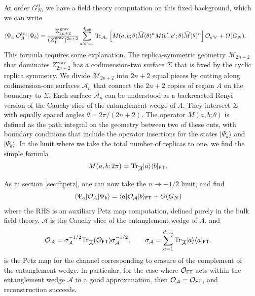 \documentclass[11pt]{article}
\newcommand{\be}{\begin{equation}}
\newcommand{\ee}{\end{equation}}
\numberwithin{equation}{section}
\def\tr{\text{Tr}}
\begin{document}
At order $G_N^0$, we have a field theory computation on this fixed background, which we can write
\begin{align}
\langle \Psi_a|\mathcal{O}_A^{(n)}|\Psi_b\rangle &=\frac{Z^{\text{grav}}_{2n+2}}{(Z^{\text{grav}}_1)^{2n+2}}\sum_{a'b'=1}^{d_{\sf code}}\tr_{\mathcal{A}_n}\left[{M}(a,b;\theta)\widehat{ M}(\theta)^n { M}(b',a';\theta)\widehat{ M}(\theta)^n\right]\mathcal{O}_{a'b'} + O(G_N).
\end{align}
This formula requires some explanation. The replica-symmetric geometry $\mathcal{M}_{2n+2}$ that dominates $Z^{\text{grav}}_{2n+2}$ has a codimension-two surface $\Sigma$ that is fixed by the cyclic replica symmetry. We divide $\mathcal{M}_{2n+2}$ into $2n+2$ equal pieces by cutting along codimension-one surfaces $\mathcal{A}_n$ that connect the $2n+2$ copies of region $A$ on the boundary to $\Sigma$. Each surface $\mathcal{A}_n$ can be understood as a backreacted Renyi version of the Cauchy slice of the entanglement wedge of $A$. They intersect $\Sigma$ with equally spaced angles $\theta = 2\pi/(2n+2)$. The operator $M(a,b;\theta)$ is defined as the path integral on the geometry between two of these cuts, with boundary conditions that include the operator insertions for the states $|\Psi_a\rangle$ and $|\Psi_b\rangle$. In the limit where we take the total number of replicas to one, we find the simple formula
\be
M(a,b;2\pi) = \tr_{\overline{\mathcal{A}}}|a\rangle\langle b|_{\sf{FT}}.
\ee

As in section \ref{sec:ftpetz}, one can now take the $n\to -1/2$ limit, and find
\be
\langle \Psi_a|\mathcal{O}_A|\Psi_b\rangle = \langle a|\mathcal{O}_{\mathcal{A}}|b\rangle_{\sf{FT}} + O(G_N)\label{RHSOF}
\ee
where the RHS is an auxiliary Petz map computation, defined purely in the bulk field theory. $\mathcal{A}$ is the Cauchy slice of the entanglement wedge of $A$, and 
\be
\mathcal{O}_{\mathcal{A}} = \sigma_{\mathcal{A}}^{-1/2} \tr_{\overline{\mathcal{A}}}(\mathcal{O}_{\sf{FT}})\sigma_{\mathcal{A}}^{-1/2}, \hspace{20pt} \sigma_{\mathcal{A}} = \sum_{a = 1}^{d_{\sf code}}\tr_{\overline{\mathcal{A}}}|a\rangle\langle a|_{\sf{FT}}.
\ee
is the Petz map for the channel corresponding to erasure of the complement of the entanglement wedge. In particular, for the case where $\mathcal{O}_{\sf FT}$ acts within the entanglement wedge $\mathcal{A}$ to a good approximation, then $\mathcal{O}_{\mathcal{A}} = \mathcal{O}_{\sf FT}$, and reconstruction succeeds.
\end{document}
